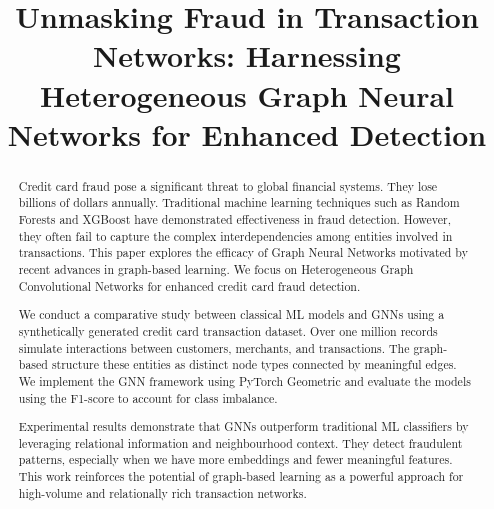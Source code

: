 \documentclass[conference]{IEEEtran}
\begin{document}
\title{Unmasking Fraud in Transaction Networks: Harnessing Heterogeneous Graph Neural Networks for Enhanced Detection\\
}

\author{
\and
{}
}

\maketitle

\begin{abstract}
Credit card fraud pose a significant threat to global financial systems. They lose billions of dollars annually. Traditional machine learning techniques such as Random Forests and XGBoost have demonstrated effectiveness in fraud detection. However, they often fail to capture the complex interdependencies among entities involved in transactions. This paper explores the efficacy of Graph Neural Networks motivated by recent advances in graph-based learning. We focus on Heterogeneous Graph Convolutional Networks for enhanced credit card fraud detection.

We conduct a comparative study between classical ML models and GNNs using a synthetically generated credit card transaction dataset. Over one million records simulate interactions between customers, merchants, and transactions. The graph-based structure these entities as distinct node types connected by meaningful edges. We implement the GNN framework using PyTorch Geometric and evaluate the models using the F1-score to account for class imbalance.

Experimental results demonstrate that GNNs outperform traditional ML classifiers by leveraging relational information and neighbourhood context. They detect fraudulent patterns, especially when we have more embeddings and fewer meaningful features. This work reinforces the potential of graph-based learning as a powerful approach for high-volume and relationally rich transaction networks.


\end{abstract}
\end{document}
